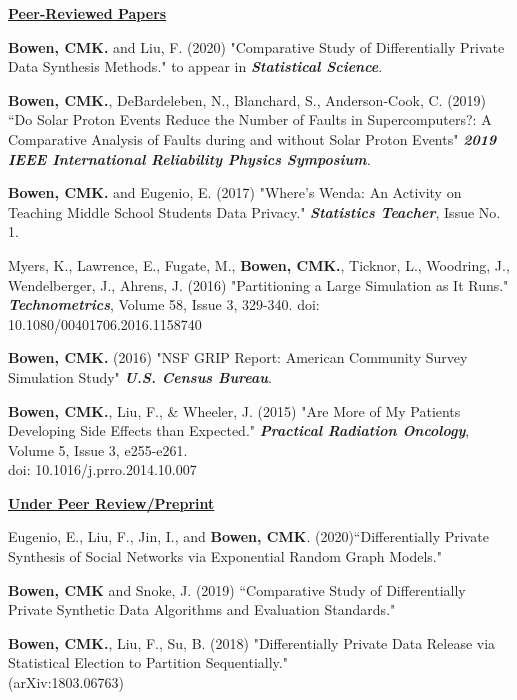 \documentclass[11pt, letterpaper, roman]{moderncv} %
\begin{document}
\noindent\underline{\textbf{Peer-Reviewed Papers}}
\vspace{6pt}
\begin{etaremune}[topsep=0pt, itemsep=12pt, partopsep=0pt, parsep=0pt]
    \item \textbf{Bowen, CMK.} and Liu, F. (2020) "Comparative Study of Differentially Private Data Synthesis Methods." to appear in \textbf{\textit{Statistical Science}}.

    \item \textbf{Bowen, CMK.}, DeBardeleben, N., Blanchard, S., Anderson-Cook, C. (2019) ``Do Solar Proton Events Reduce the Number of Faults in Supercomputers?: A Comparative Analysis of Faults during and without Solar Proton Events" \textit{\textbf{2019 IEEE International Reliability Physics Symposium}.}

    \item \textbf{Bowen, CMK.} and Eugenio, E. (2017) "Where's Wenda:  An Activity on Teaching Middle School Students Data Privacy." \textit{\textbf{Statistics Teacher}}, Issue No. 1.
    
    \item Myers, K., Lawrence, E., Fugate, M., \textbf{Bowen, CMK.}, Ticknor, L., Woodring, J., Wendelberger, J., Ahrens, J. (2016) "Partitioning a Large Simulation as It Runs." \textit{\textbf{Technometrics}}, Volume 58, Issue 3, 329-340. 
    doi: 10.1080/00401706.2016.1158740

    \item \textbf{Bowen, CMK.} (2016) "NSF GRIP Report: American Community Survey Simulation Study" \textbf{\textit{U.S. Census Bureau}}.   

    \item \textbf{Bowen, CMK.}, Liu, F., \& Wheeler, J. (2015) "Are More of My Patients Developing Side Effects than Expected." \textit{\textbf{Practical Radiation Oncology}}, Volume 5, Issue 3, e255-e261.\\
    doi: 10.1016/j.prro.2014.10.007
    
\vspace{6pt}
\hspace{-0.30in}\noindent\underline{\textbf{Under Peer Review/Preprint}}
    \item Eugenio, E., Liu, F., Jin, I., and \textbf{Bowen, CMK}. (2020)``Differentially Private Synthesis of Social Networks via Exponential Random Graph Models."
    
    \item \textbf{Bowen, CMK} and Snoke, J. (2019) ``Comparative Study of Differentially Private Synthetic Data Algorithms and Evaluation Standards."

    \item \textbf{Bowen, CMK.}, Liu, F., Su, B. (2018) "Differentially Private Data Release via Statistical Election to Partition Sequentially."\\
    (arXiv:1803.06763)
\end{etaremune}
\end{document}
